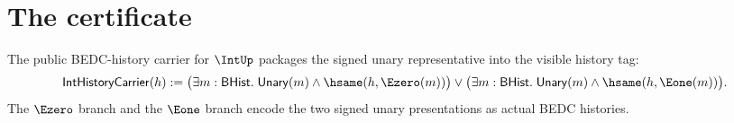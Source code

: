 \section{The certificate}

\begin{definition}
\label{def:intup-history-carrier}
The public BEDC-history carrier for $\IntUp$ packages the signed unary
representative into the visible history tag:
$$
\mathsf{IntHistoryCarrier}(h)
:=
\bigl(\exists m:\mathsf{BHist}.\;
\mathsf{Unary}(m)\land\hsame(h,\Ezero(m))\bigr)
\lor
\bigl(\exists m:\mathsf{BHist}.\;
\mathsf{Unary}(m)\land\hsame(h,\Eone(m))\bigr).
$$
The $\Ezero$ branch and the $\Eone$ branch encode the two signed unary
presentations as actual BEDC histories.
\end{definition}

